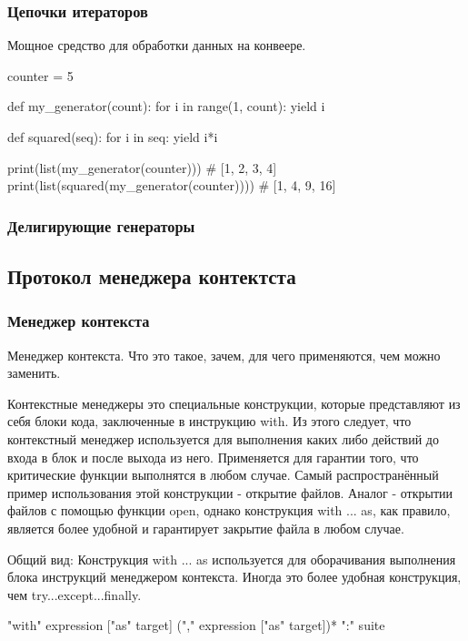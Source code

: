 \subsubsection{Цепочки итераторов}

Мощное средство для обработки данных на конвеере.

\begin{python}
counter = 5

def my_generator(count):
    for i in range(1, count):
        yield i

def squared(seq):
    for i in seq:
        yield i*i

print(list(my_generator(counter))) # [1, 2, 3, 4]
print(list(squared(my_generator(counter)))) # [1, 4, 9, 16]

\end{python}


\subsubsection{Делигирующие генераторы}

\subsection{Протокол менеджера контектста}

\subsubsection{Менеджер контекста}		

Менеджер контекста. Что это такое, зачем, для чего применяются, чем можно заменить. 

		Контекстные менеджеры это специальные конструкции, которые представляют из себя блоки кода, заключенные в инструкцию with. Из этого следует, что контекстный менеджер используется для выполнения каких либо действий до входа в блок и после выхода из него.  Применяется для гарантии того, что критические функции выполнятся в любом случае. Самый распространённый пример использования этой конструкции - открытие файлов. Аналог - открытии файлов с помощью функции open, однако конструкция with ... as, как правило, является более удобной и гарантирует закрытие файла в любом случае.
	
	Общий вид: Конструкция with ... as используется для оборачивания выполнения блока инструкций менеджером контекста. Иногда это более удобная конструкция, чем try...except...finally.
	\begin{python}
	"with" expression ["as" target] ("," expression ["as" target])* ":"
	    suite
	\end{python}
	
